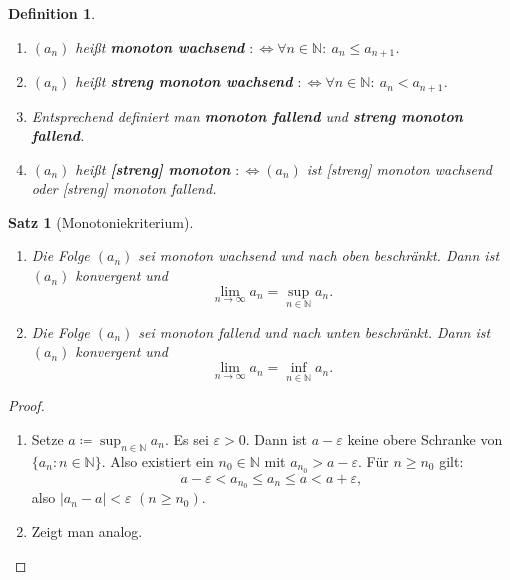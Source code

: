 \documentclass[12pt]{extreport} %
\newcommand{\N}{\mathbb{N}}
\theoremstyle{named}
\theoremstyle{itshape}
\newtheorem{satz}[unnamedtheorem]{Satz}
\newtheorem*{definition}{Definition}
\theoremstyle{normal}
\begin{document}
       
\begin{definition}\ 
	\begin{enumerate}
		\item $(a_{n})$ hei{\ss}t \textbf{monoton wachsend} $:\iff \forall n \in \N: ~ a_n \leq a_{n+1}$.
		\item $(a_{n})$ hei{\ss}t \textbf{streng monoton wachsend} $:\iff \forall n \in \N: ~ a_n < a_{n+1}$.
		\item Entsprechend definiert man \textbf{monoton fallend} und \textbf{streng monoton fallend}.
		\item $(a_{n})$ hei{\ss}t \textbf{[streng] monoton} $:\iff (a_{n})$ ist [streng] monoton wachsend oder [streng] monoton fallend.
	\end{enumerate}
\end{definition}

\begin{satz}[Monotoniekriterium] ~\ \label{2.3:prop}
	\begin{enumerate}
		\item Die Folge $(a_{n})$ sei monoton wachsend und nach oben beschränkt. Dann ist $(a_{n})$ konvergent und 
			$$
				\lim_{n \rightarrow \infty} a_{n} = \sup_{n \in \N} a_{n}.
			$$
		\item Die Folge $(a_{n})$ sei monoton fallend und nach unten beschränkt. Dann ist $(a_{n})$ konvergent und 
			$$
				\lim_{n \rightarrow \infty} a_{n} = \inf_{n \in \N} a_{n}.
			$$
	\end{enumerate}
\end{satz}

\begin{proof} ~\
\begin{enumerate}		
	\item	Setze $a \coloneqq \sup_{n \in \N} a_{n}$. Es sei $\varepsilon > 0$. Dann ist $a - \varepsilon$ keine obere Schranke von $\{ a_{n}: n \in \N\}$. 
	                Also existiert ein $n_{0} \in \N$ mit $a_{n_{0}} > a - \varepsilon$. Für $n \geq n_{0}$ gilt:
			$$
				a - \varepsilon < a_{n_{0}} \leq a_{n} \leq a < a + \varepsilon,
			$$
			also $|a_{n} - a| < \varepsilon$ $(n \geq n_{0})$.
	\item   Zeigt man analog.
\end{enumerate}
\end{proof}

\end{document}
